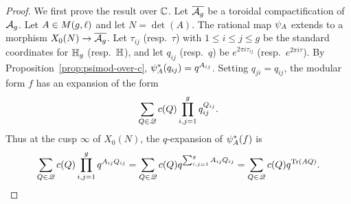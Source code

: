 \documentclass{amsart}
\begin{document}
\begin{proof}
  We first prove the result over $\mathbb{C}$. Let $\overline{\mathcal{A}_g}$ be a toroidal compactification of $\mathcal{A}_g$. Let $A \in M(g,\ell)$ and let $N=\det(A)$. The rational map $\psi_{A}$ extends to a morphism $X_0(N) \to \overline{\mathcal{A}_g}$. Let $\tau_{ij}$ (resp.~$\tau$) with $1 \leq i \leq j \leq g$ be the standard coordinates for $\mathbb{H}_g$ (resp.~$\mathbb{H}$), and let $q_{ij}$ (resp.~$q$) be $e^{2\pi i \tau_{ij}}$ (resp.~$e^{2\pi i \tau}$). By Proposition~\ref{prop:psimod-over-c}, $\psi_{A}^*(q_{ij}) = q^{A_{ij}}$. Setting $q_{ji} = q_{ij}$, the modular form $f$ has an expansion of the form
    \[
      \sum_{Q \in \mathscr{Q}} c(Q) \prod_{i,j=1}^g q_{ij}^{Q_{ij}}.
    \]
    Thus at the cusp $\infty$ of $X_0(N)$, the $q$-expansion of $\psi_{A}^*(f)$ is
    $$\sum_{Q \in \mathscr{Q}} c(Q) \prod_{i,j=1}^g q^{A_{ij}Q_{ij}} = \sum_{Q \in \mathscr{Q}} c(Q) q^{\sum_{i,j=1}^g A_{ij}Q_{ij}}
    = \sum_{Q \in \mathscr{Q}} c(Q) q^{\operatorname{Tr}(AQ)}.$$


\end{proof}
\end{document}
